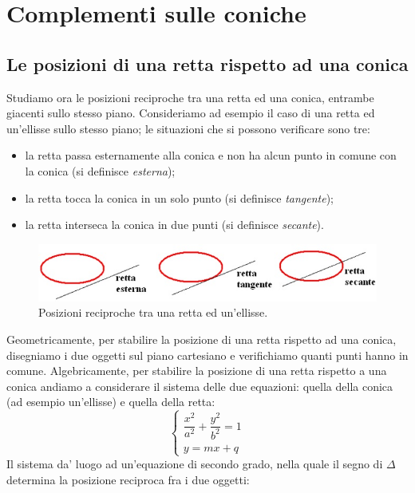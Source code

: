 


\chapter{Complementi sulle coniche}
\label{sec:coniche}

\section{Le posizioni di una retta rispetto ad una conica}
\label{sec:coniche_e_retta}

Studiamo ora le posizioni reciproche tra una retta ed una conica, entrambe 
giacenti sullo stesso piano. Consideriamo ad esempio il caso di una retta 
ed un'ellisse sullo stesso piano; le situazioni che si possono verificare 
sono tre:
\begin{itemize} [noitemsep]
  \item la retta passa esternamente alla conica e non ha alcun 
punto in comune con la conica (si definisce \emph{esterna});
  \item la retta tocca la conica in un solo punto
 (si definisce \emph{tangente});
  \item la retta interseca la conica in due punti  (si definisce \emph{secante}).
  \end{itemize}
  
\begin{figure}[htbp]
  \centering
  \includegraphics[width=\textwidth]{img/rettaconica.jpg}
  \caption{Posizioni reciproche tra una retta ed un'ellisse.}%
\end{figure}
Geometricamente, per stabilire la posizione di una retta rispetto ad una 
conica, disegniamo i due oggetti sul piano cartesiano e verifichiamo quanti 
punti hanno in comune. Algebricamente, per stabilire la posizione di una 
retta rispetto a una conica andiamo a considerare il sistema delle due 
equazioni: quella della conica (ad esempio un'ellisse) e quella della 
retta:
\[\begin{cases}  \dfrac{x^{2}}{a^{2}}+\dfrac{y^{2}}{b^{2}}=1   \\ y=mx+q  
\end{cases}\]
Il sistema da' luogo ad un'equazione di secondo grado, nella quale il 
segno di \(\Delta\) determina la posizione reciproca fra i due oggetti:


